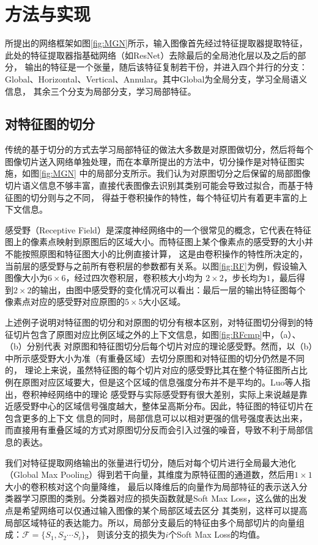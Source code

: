 \section{方法与实现}
所提出的网络框架如图\ref{fig:MGN}所示，输入图像首先经过特征提取器提取特征，此处的特征提取器指基础网络（如ResNet）去除最后的全局池化层以及之后的部分，
输出的特征是一个张量，随后该特征复制若干份，并进入四个并行的分支：Global、Horizontal、Vertical、Annular。其中Global为全局分支，学习全局语义信息，
其余三个分支为局部分支，学习局部特征。

\subsection{对特征图的切分}
传统的基于切分的方式去学习局部特征的做法大多数是对原图做切分，然后将每个图像切片送入网络单独处理，而在本章所提出的方法中，切分操作是对特征图实施，如图\ref{fig:MGN}
中的局部分支所示。我们认为对原图切分之后保留的局部图像切片语义信息不够丰富，直接代表图像去识别其类别可能会导致过拟合，而基于特征图的切分则与之不同，
得益于卷积操作的特性，每个特征切片有着更丰富的上下文信息。


感受野（Receptive Field）是深度神经网络中的一个很常见的概念，它代表在特征图上的像素点映射到原图后的区域大小。而特征图上某个像素点的感受野的大小并不能按照原图和特征图大小的比例直接计算，
这是由卷积操作的特性所决定的，当前层的感受野与之前所有卷积层的参数都有关系。以图\ref{fig:RF}为例，假设输入图像大小为$6 \times 6$，经过四次卷积层，卷积核大小均为
$2 \times 2$，步长均为$1$，最后得到$2 \times 2$的输出，由图中感受野的变化情况可以看出：最后一层的输出特征图每个像素点对应的感受野对应原图的$5 \times 5$大小区域。


上述例子说明对特征图的切分和对原图的切分有根本区别，对特征图切分得到的特征切片包含了原图对应比例区域之外的上下文信息，如图\ref{fig:RFcmp}中，（a）、（b）分别代表
对原图和特征图切分后每个切片对应的理论感受野。然而，以（b）中所示感受野大小为准（有重叠区域）去切分原图和对特征图的切分仍然是不同的，
理论上来说，虽然特征图的每个切片对应的感受野比其在整个特征图所占比例在原图对应区域要大，但是这个区域的信息强度分布并不是平均的。Luo等人指出，卷积神经网络中的理论
感受野与实际感受野有很大差别，实际上来说越是靠近感受野中心的区域信号强度越大，整体呈高斯分布\cite{luo2016understanding}。因此，特征图的特征切片在包含更多的上下文
信息的同时，局部信息可以以相对更强的信号强度表达出来，而直接用有重叠区域的方式对原图切分反而会引入过强的噪音，导致不利于局部信息的表达。

我们对特征提取网络输出的张量进行切分，随后对每个切片进行全局最大池化（Global Max Pooling）得到若干向量，其维度为原特征图的通道数，然后用$1 \times 1$大小的卷积核对这个向量降维，
最后以降维后的向量作为局部特征的表示送入分类器学习原图的类别。分类器对应的损失函数就是Soft Max Loss，这么做的出发点是希望网络可以仅通过输入图像的某个局部区域去区分
其类别，这样可以提高局部区域特征的表达能力。所以，局部分支最后的特征由多个局部切片的向量组成：$\mathcal{F}=\{S_{1},S_{2}\cdots S_{i}\}$，
则该分支的损失为$i$个Soft Max Loss的均值。
